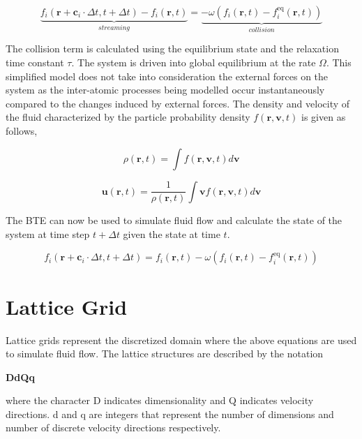 \documentclass[a4paper,11pt]{report}
\begin{document}
\begin{equation}\label{eq:LBE_2}
\underbrace{f_i(\mathbf{r}+\mathbf{c}_i\cdot\Delta t,t+\Delta t)-f_i(\mathbf{r},t)}_{streaming}=
\underbrace{-\omega \left( f_i(\mathbf{r},t)-f_i^\text{eq}(\mathbf{r},t) \right)}_{collision}
\end{equation}

The collision term is calculated using the equilibrium state and the relaxation time constant $\tau$. The system is driven into global equilibrium at the rate $\Omega$. This simplified model does not take into consideration the external forces on the system as the inter-atomic processes being modelled occur instantaneously compared to the changes induced by external forces. The density and velocity of the fluid characterized by the particle probability density $f(\mathbf{r},\mathbf{v},t)$ is given as follows,

\begin{equation}
    \rho (\mathbf{r}, t) =  \int f\left(\mathbf{r},\mathbf{v},t\right) d\mathbf{v}
\end{equation}

\begin{equation}
    \mathbf{u}(\mathbf{r}, t) = \frac1 {\rho (\mathbf{r}, t)} \int \mathbf{v} f\left(\mathbf{r},\mathbf{v},t\right) d\mathbf{v}
\end{equation}


The BTE can now be used to simulate fluid flow and calculate the state of the system at time step $t+\Delta t$ given the state at time $t$.

\begin{equation}\label{eq:LBE_3}
f_i(\mathbf{r}+\mathbf{c}_i\cdot\Delta t,t+\Delta t) = f_i(\mathbf{r},t)
-\omega \left( f_i(\mathbf{r},t)-f_i^\text{eq}(\mathbf{r},t) \right)
\end{equation}

\section{Lattice Grid}
Lattice grids represent the discretized domain where the above equations are used to simulate fluid flow. The lattice structures are described by the notation 

\begin{center}
    \textbf{DdQq}
\end{center}

where the character D indicates dimensionality and Q indicates velocity directions. d and q are integers that represent the number of dimensions and number of discrete velocity directions respectively.
\end{document}
